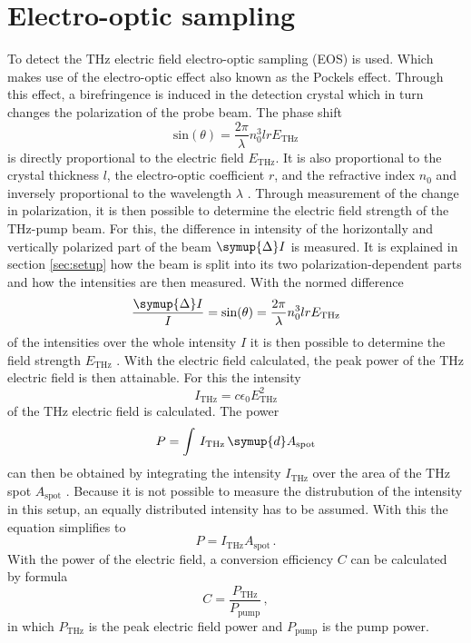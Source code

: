 \section{Electro-optic sampling}\label{sec:eos}
To detect the $\si{\tera\hertz}$ electric field electro-optic sampling (EOS) is used.
Which makes use of the electro-optic effect also known as the Pockels effect.
Through this effect, a birefringence is induced in the detection crystal which in turn changes the polarization of the probe beam.
The phase shift 
\begin{equation}
    \text{sin}(\theta) = \frac{2\pi}{\lambda} n_0^3 l r E_\text{THz}
\end{equation}
is directly proportional to the electric field $E_\text{THz}$. 
It is also proportional to the crystal thickness $l$, the electro-optic coefficient $r$, and the refractive index $n_0$ and inversely proportional to the wavelength $\lambda$ \cite{wiki_book}. 
Through measurement of the change in polarization, it is then possible to determine the electric field strength of the $\si{\tera\hertz}$-pump beam.
For this, the difference in intensity of the horizontally and vertically polarized part of the beam $\symup{\Delta}I$ is measured.
It is explained in section \ref{sec:setup} how the beam is split into its two polarization-dependent parts and how the intensities are then measured.
With the normed difference 
\begin{equation}
    \frac{\symup{\Delta}I}{I} = \text{sin}(\theta) = \frac{2\pi}{\lambda} n_0^3 l r E_\text{THz}
    \label{eq:electricfield_A_B}
\end{equation}
of the intensities over the whole intensity $I$ it is then possible to determine the field strength $E_\text{THz}$ \cite{THZ_eltric_field}.
With the electric field calculated, the peak power of the $\si{\tera\hertz}$ electric field is then attainable.
For this the intensity
\begin{equation}
    I_\text{THz} = c \epsilon_0 E_\text{THz}^2
    \label{eq:intensity}
\end{equation}
of the $\si{\tera\hertz}$ electric field is calculated.
The power 
\begin{equation}
    P = \int\, I_\text{THz} \,\symup{d}A_\text{spot}
\end{equation}
can then be obtained by integrating the intensity $I_\text{THz}$ over the area of the $\si{\tera\hertz}$ spot $A_\text{spot}$ \cite{griffiths}.
Because it is not possible to measure the distrubution of the intensity in this setup, an equally distributed intensity has to be assumed.
With this the equation simplifies to 
\begin{equation}
    P = I_\text{THz}A_\text{spot}\,.
    \label{eq:power}
\end{equation}
With the power of the electric field, a conversion efficiency $C$ can be calculated by formula
\begin{equation}
    C = \frac{P_\text{THz}}{P_\text{pump}} \, ,
    \label{eq:conversion}
\end{equation}
in which $P_\text{THz}$ is the peak electric field power and $P_\text{pump}$ is the pump power.


